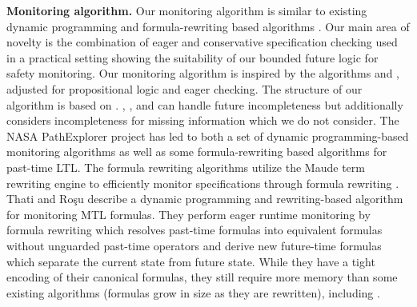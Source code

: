\vspace*{3pt}
\noindent
\textbf{Monitoring algorithm.}
Our monitoring algorithm is similar to existing dynamic programming and
formula-rewriting based algorithms \cite{Havelund2004,Havelund2002,Rosu2005,Thati2005,Basin2012}.
Our main area of novelty is the combination of eager and conservative specification checking used in a practical setting showing the suitability of our bounded future logic for safety monitoring.
Our monitoring algorithm is inspired by the algorithms \greduce \cite{Garg2011} and
\precis \cite{Chowdhury2014}, adjusted for propositional logic and eager checking.
The structure of our algorithm is based on \greduce.
\greduce, \precis, and \monitor can handle future incompleteness but \greduce additionally
considers incompleteness for missing information which we do not consider.
%
%
The NASA PathExplorer project has led to both a set of dynamic programming-based monitoring algorithms as
well as some formula-rewriting based algorithms \cite{Havelund2004} for past-time LTL.
The formula rewriting algorithms utilize the Maude term rewriting engine to efficiently monitor specifications
through formula rewriting \cite{Rosu2005}.
%
Thati and Ro\c{s}u \cite{Thati2005} describe a dynamic programming and rewriting-based
algorithm for monitoring MTL formulas.
They perform eager runtime monitoring by formula rewriting which resolves past-time formulas
into equivalent formulas without unguarded past-time operators and derive new future-time
formulas which separate the current state from future state.
While they have a tight encoding of their canonical formulas, they still require more memory
than some existing algorithms (formulas
grow in size as they are rewritten), including
\monitor.


